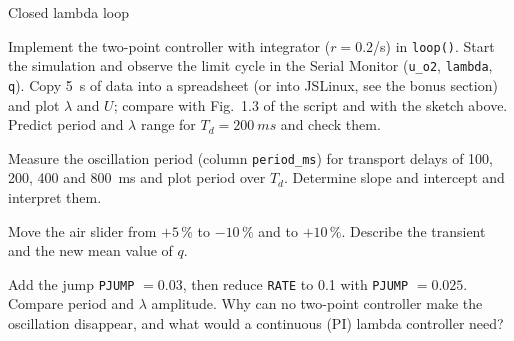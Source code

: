 \begin{exercise}{Closed lambda loop}{\Wokwi}
\begin{tasks}
  \item Implement the two-point controller with integrator ($r=0.2$/s) in
    \texttt{loop()}. Start the simulation and observe the limit cycle in the
    Serial Monitor (\texttt{u\_o2}, \texttt{lambda}, \texttt{q}). Copy
    \SI{5}{s} of data into a spreadsheet (or into JSLinux, see the bonus
    section) and plot $\lambda$ and $U$; compare with Fig.~1.3 of the script
    and with the sketch above. Predict period and $\lambda$ range for
    $T_d=\SI{200}{ms}$ and check them.
  \item Measure the oscillation period (column \texttt{period\_ms}) for transport
    delays of 100, 200, 400 and \SI{800}{ms} and plot period over $T_d$. Determine
    slope and intercept and interpret them.
  \item Move the air slider from $+5\,\%$ to $-10\,\%$ and to $+10\,\%$. Describe
    the transient and the new mean value of $q$.
  \item Add the jump \texttt{PJUMP} $=0.03$, then reduce \texttt{RATE} to 0.1 with
    \texttt{PJUMP} $=0.025$. Compare period and $\lambda$ amplitude. Why can no
    two-point controller make the oscillation disappear, and what would a
    continuous (PI) lambda controller need?
\end{tasks}
\end{exercise}

